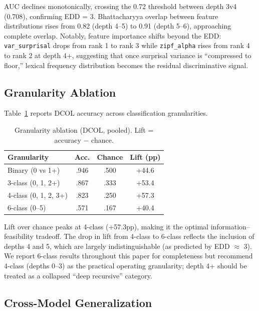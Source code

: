 \documentclass[11pt,a4paper]{article}
\begin{document}
AUC declines monotonically, crossing the 0.72 threshold between depth 3v4 (0.708), confirming EDD = 3.
Bhattacharyya overlap between feature distributions rises from 0.82 (depth 4--5) to 0.91 (depth 5--6), approaching complete overlap.
Notably, feature importance shifts beyond the EDD: \texttt{var\_surprisal} drops from rank 1 to rank 3 while \texttt{zipf\_alpha} rises from rank 4 to rank 2 at depth 4+, suggesting that once surprisal variance is ``compressed to floor,'' lexical frequency distribution becomes the residual discriminative signal.

\subsection{Granularity Ablation}
\label{sec:granularity}

Table~\ref{tab:granularity} reports DCOL accuracy across classification granularities.

\begin{table}[t]
\centering
\small
\caption{Granularity ablation (DCOL, pooled). Lift = accuracy $-$ chance.}
\label{tab:granularity}
\begin{tabular}{@{}lccc@{}}
\toprule
\textbf{Granularity} & \textbf{Acc.} & \textbf{Chance} & \textbf{Lift (pp)} \\
\midrule
Binary (0 vs 1+) & .946 & .500 & +44.6 \\
3-class (0, 1, 2+) & .867 & .333 & +53.4 \\
4-class (0, 1, 2, 3+) & .823 & .250 & +57.3 \\
6-class (0--5) & .571 & .167 & +40.4 \\
\bottomrule
\end{tabular}
\end{table}

Lift over chance peaks at 4-class (+57.3pp), making it the optimal information--feasibility tradeoff.
The drop in lift from 4-class to 6-class reflects the inclusion of depths 4 and 5, which are largely indistinguishable (as predicted by EDD $\approx$ 3).
We report 6-class results throughout this paper for completeness but recommend 4-class (depths 0--3) as the practical operating granularity; depth 4+ should be treated as a collapsed ``deep recursive'' category.

\subsection{Cross-Model Generalization}
\label{sec:cross_model}
\end{document}
